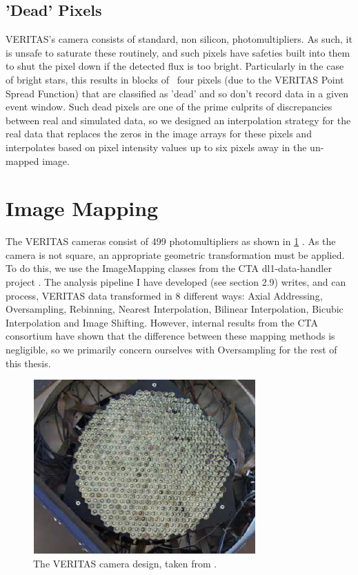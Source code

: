 \subsection{'Dead' Pixels}
VERITAS's camera consists of standard, non silicon, photomultipliers. As such, it is unsafe to saturate these routinely, and such pixels have safeties built into them to shut the pixel down if the detected flux is too bright. Particularly in the case of bright stars, this results in blocks of ~four pixels (due to the VERITAS Point Spread Function) that are classified as 'dead' and so don't record data in a given event window. Such dead pixels are one of the prime culprits of discrepancies between real and simulated data, so we designed an interpolation strategy for the real data that replaces the zeros in the image arrays for these pixels and interpolates based on pixel intensity values up to six pixels away in the un-mapped image.  


\section{Image Mapping}
The VERITAS cameras consist of 499 photomultipliers as shown in \ref{fig:verc} \cite{vercam}.
As the camera is not square, an appropriate geometric transformation must be applied. To do this, we use the ImageMapping classes from the CTA dl1-data-handler project \cite{dl1dh}. The analysis pipeline I have developed (see section 2.9) writes, and can process, VERITAS data transformed in 8 different ways: Axial Addressing, Oversampling, Rebinning, Nearest Interpolation, Bilinear Interpolation, Bicubic Interpolation and Image Shifting. However, internal results from the CTA consortium have shown that the difference between these mapping methods is negligible, so we primarily concern ourselves with Oversampling for the rest of this thesis.
\begin{figure}[h]
        \begin{center}
        \includegraphics[width=\columnwidth]{figures/verc.png}

        \caption{
                \label{fig:verc} 
                The VERITAS camera design, taken from \cite{vercam}. 
        }
        \end{center}
\end{figure}



